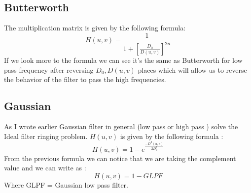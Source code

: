 \documentclass{article}
\begin{document}
\begin{multicols*}{2}
\subsection{Butterworth}
The multiplication matrix is given by the following formula:
\[H(u,v)=\frac{1}{1+[\frac{D_0}{D(u,v)}]^{2n}}\]
If we look more to the formula we can see it's the same as Butterworth for low pass frequency after reversing \(D_0, D(u,v)\) places which will allow us to reverse the behavior of the filter to pass the high frequencies.
\subsection{Gaussian}
As I wrote earlier Gaussian filter in general (low pass or high pass ) solve the Ideal filter ringing problem. \(H(u,v)\) is given by the following formula :
\[ H(u,v) =1- e^{\frac{-D^2(u,v)}{2D_0^2}}\]
From the previous formula we can notice that we are taking the complement value and we can write as : 
\[H(u,v) = 1- GLPF\]
Where GLPF = Gaussian low pass filter.
\end{multicols*}
\end{document}
